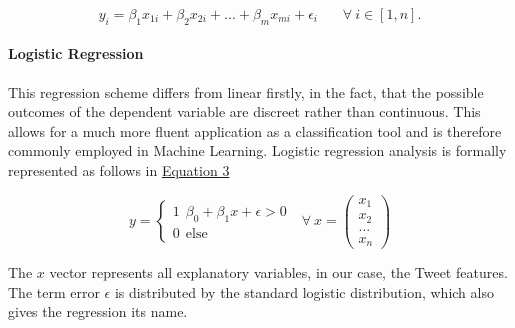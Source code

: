 			\begin{equation}
				y_i = \beta_1 x_{1i}+ \beta_2 x_{2i} + ... + \beta_m x_{mi} + \epsilon_i \ \ \ \ \ \ \ \ 
				\forall \ i \in [1,n].
				\label{Linear_Regression}
			\end{equation}
			
			\paragraph{Logistic Regression} This regression scheme differs from linear firstly, in the fact, that the possible outcomes of the dependent variable are discreet rather than continuous. This allows for a much more fluent application as a classification tool and is therefore commonly employed in  Machine Learning. Logistic regression analysis is formally represented as follows in  \hyperref[logit]{Equation 3}
			
			\begin{equation}
				y = 
				\begin{cases}
				1 \ \  \beta_0 + \beta_1 x + \epsilon > 0 \\
				0 \ \  \text{else } 
				\end{cases} \text{         } \forall \  x = 
				\begin{pmatrix}x_1\\x_2\\...\\x_n \end{pmatrix}
			\end{equation}
			
			The $x$ vector represents all explanatory variables, in our case, the Tweet features. The term error $\epsilon$ is distributed by the standard logistic distribution, which also gives the regression its name.
	
	
	
	
		
		
		
		